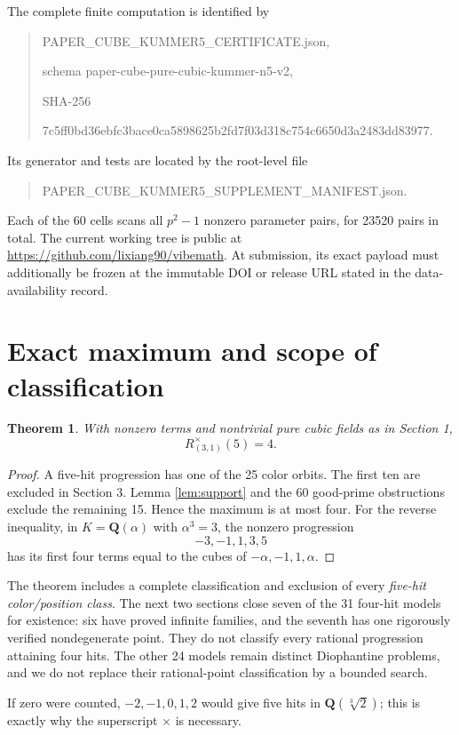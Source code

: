 \documentclass[10pt]{article}
\newtheorem{theorem}{Theorem}[section]
\newcommand{\Q}{\mathbf Q}
\begin{document}
The complete finite computation is identified by
\begin{quote}\small\ttfamily
PAPER\_CUBE\_KUMMER5\_CERTIFICATE.json,\par
schema paper-cube-pure-cubic-kummer-n5-v2,\par
SHA-256\par
7c5ff0bd36ebfc3bace0ca5898625b2fd7f03d318c754c6650d3a2483dd83977.
\end{quote}
Its generator and tests are located by the root-level file
\begin{quote}\small\ttfamily
PAPER\_CUBE\_KUMMER5\_SUPPLEMENT\_MANIFEST.json.
\end{quote}
Each of the 60
cells scans all $p^2-1$ nonzero parameter pairs, for 23520 pairs in total.
The current working tree is public at
\url{https://github.com/lixiang90/vibemath}.  At submission, its exact payload
must additionally be frozen at the immutable DOI or release URL stated in the
data-availability record.

\section{Exact maximum and scope of classification}
\begin{theorem}\label{thm:main}
With nonzero terms and nontrivial pure cubic fields as in Section 1,
\[
R^{\times}_{(3,1)}(5)=4.
\]
\end{theorem}
\begin{proof}
A five-hit progression has one of the 25 color orbits.  The first ten are
excluded in Section 3.  Lemma \ref{lem:support} and the 60 good-prime
obstructions exclude the remaining 15.  Hence the maximum is at most four.
For the reverse inequality, in $K=\Q(\alpha)$ with $\alpha^3=3$, the nonzero
progression
\[
-3,-1,1,3,5
\]
has its first four terms equal to the cubes of
$-\alpha,-1,1,\alpha$.
\end{proof}

The theorem includes a complete classification and exclusion of every
\emph{five-hit color/position class}.  The next two sections close seven of
the 31 four-hit models for existence: six have proved infinite families, and
the seventh has one rigorously verified nondegenerate point.  They do not
classify every rational progression attaining four hits.  The other 24
models remain distinct Diophantine problems, and we do not replace their
rational-point classification by a bounded search.

If zero were counted, $-2,-1,0,1,2$ would give five hits in
$\Q(\sqrt[3]{2})$; this is exactly why the superscript $\times$ is necessary.
\end{document}

